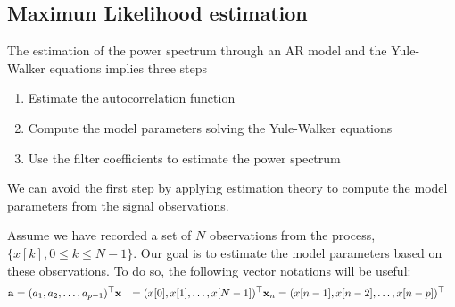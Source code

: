 \subsection{Maximun Likelihood estimation}

The estimation of the power spectrum through an AR model and the Yule-Walker equations implies three steps

\begin{enumerate}
\item Estimate the autocorrelation function
\item Compute the model parameters solving the Yule-Walker equations
\item Use the filter coefficients to estimate the power spectrum
\end{enumerate}

We can avoid the first step by applying estimation theory to compute the model parameters from the signal observations.

Assume we have recorded a set of $N$ observations from the process, $\{x[k], 0\le k \le N-1\}$. Our goal is to estimate the model parameters based on these observations. To do so, the following vector notations will be useful:
\begin{align}
{\bf a} &= (a_1, a_2, \ldots, a_{p-1})^\top
{\bf x} &= (x[0], x[1], \ldots, x[N-1])^\top
{\bf x}_n &= (x[n-1], x[n-2], \ldots, x[n-p])^\top
\end{align}

